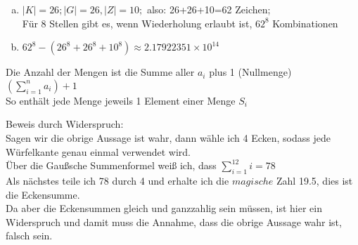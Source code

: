 \documentclass{disloloesung}
\begin{document}
\begin{sheet}{1}

    \begin{aufgabe}{1.1}{}
	\begin{enumerate}[(a)]
	  \item $|K| = 26; |G| = 26, |Z| = 10;$ also: 26+26+10=62 Zeichen; \\ Für 8 Stellen gibt es, wenn Wiederholung erlaubt ist, $62^8$ Kombinationen
	  \item $62^8-(26^8+26^8+10^8) \approx 2.17922351\times10^{14}$
	\end{enumerate}
    \end{aufgabe}

    \begin{aufgabe}{1.2}{}
	Die Anzahl der Mengen ist die Summe aller $a_{i}$ plus 1 (Nullmenge)
	$(\sum\limits_{i=1}^{n} a_{i}) +1$ \\
	So enthält jede Menge jeweils 1 Element einer Menge $S_{i}$
    \end{aufgabe}

    \begin{aufgabe}{1.3}{}
	Beweis durch Widerspruch:\\
	Sagen wir die obrige Aussage ist wahr, dann wähle ich 4 Ecken, sodass jede Würfelkante genau einmal verwendet wird.\\ Über die Gaußsche Summenformel 
	weiß ich, dass $\sum\limits_{i=1}^{12} i = 78$\\
	Als nächstes teile ich 78 durch 4 und erhalte ich die $magische$ Zahl 19.5, dies ist die Eckensumme.\\ Da aber die Eckensummen gleich und ganzzahlig sein müssen, ist hier ein Widerspruch und damit muss die Annahme, dass die obrige Aussage wahr ist, falsch sein.
    \end{aufgabe}
    

\end{sheet}
\end{document}
